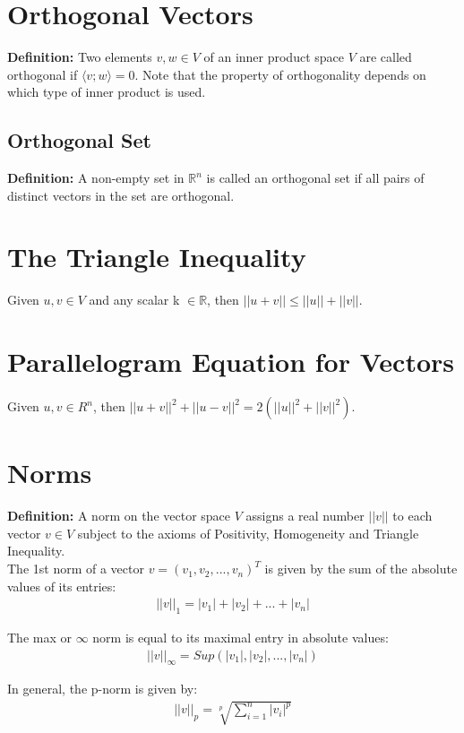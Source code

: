 \documentclass{article}
\newcommand{\real}{\mathbb{R}}
\begin{document}
\section{Orthogonal Vectors}
\textbf{Definition:} Two elements $ v, w \in V $ of an inner product 
space $ V $ are called orthogonal if $ \langle v; w \rangle = 0 $. Note
that the property of orthogonality depends on which type of inner 
product is used.

\subsection{Orthogonal Set}
\textbf{Definition:} A non-empty set in $ \real^n $ is called
an orthogonal set if all pairs of distinct vectors in the set
are orthogonal.

\section{The Triangle Inequality}
Given $ u, v \in V $ and any scalar k $ \in \real $, then
$ || u + v || \leq ||u|| + ||v|| $.

\section{Parallelogram Equation for Vectors}
Given $ u, v \in R^n $, then 
$ ||u + v||^2 + ||u - v||^2 = 2(||u||^2 + ||v||^2)$. 

\section{Norms}
\textbf{Definition:} A norm on the vector space $ V $ assigns a 
real number $ ||v|| $ to each vector $ v \in V $ subject to the
axioms of Positivity, Homogeneity and Triangle Inequality. \\

The 1st norm of a vector $ v = (v_1, v_2, ..., v_n)^T $ is given
by the sum of the absolute values of its entries:
\begin{gather*}
  ||v||_1 = |v_1| + |v_2| + ... + |v_n|
\end{gather*}

The max or $ \infty $ norm is equal to its maximal entry in 
absolute values:
\begin{gather*}
  ||v||_{\infty} = Sup(|v_1|, |v_2|, ..., |v_n|)
\end{gather*}

In general, the p-norm is given by:
\begin{gather*}
  ||v||_p = \sqrt[p]{
    \sum_{i = 1}^{n} |v_i|^p
  }
\end{gather*}
\end{document}
